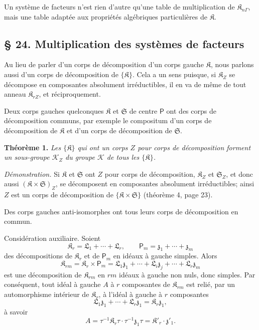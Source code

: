 Un système de facteurs n'est rien d'autre qu'une table de multiplication de \(\mathfrak K_{n\Gamma}\), mais une table adaptée aux propriétés algébriques particulières de \(\mathfrak K\).

\subsection*{\S{} 24. Multiplication des systèmes de facteurs}\label{fr-r823-multiplication-systemes-facteurs}

Au lieu de parler d'un corps de décomposition d'un corps gauche \(\mathfrak K\), nous parlons aussi d'un corps de décomposition de \(\{\mathfrak K\}\). Cela a un sens puisque, si \(\mathfrak K_Z\) se décompose en composantes absolument irréductibles, il en va de même de tout anneau \(\mathfrak K_{rZ}\), et réciproquement.

Deux corps gauches quelconques \(\mathfrak K\) et \(\mathfrak S\) de centre \(\mathsf P\) ont des corps de décomposition communs, par exemple le compositum d'un corps de décomposition de \(\mathfrak K\) et d'un corps de décomposition de \(\mathfrak S\).

\textbf{Théorème 1.} \emph{Les \(\{\mathfrak K\}\) qui ont un corps \(Z\) pour corps de décomposition forment un sous-groupe \(\mathscr K_Z\) du groupe \(\mathscr K\) de tous les \(\{\mathfrak K\}\).}

\emph{Démonstration.} Si \(\mathfrak K\) et \(\mathfrak S\) ont \(Z\) pour corps de décomposition, \(\mathfrak K_Z\) et \(\mathfrak S_Z\), et donc aussi \((\mathfrak K\times\mathfrak S)_Z\), se décomposent en composantes absolument irréductibles; ainsi \(Z\) est un corps de décomposition de \(\{\mathfrak K\times\mathfrak S\}\) (théorème 4, page 23).

Des corps gauches anti-isomorphes ont tous leurs corps de décomposition en commun.

Considération auxiliaire. Soient
\[
\mathfrak K_r=\mathfrak L_1+\cdots+\mathfrak L_r,\qquad
\mathsf P_m=\mathfrak z_1+\cdots+\mathfrak z_m
\]
des décompositions de \(\mathfrak K_r\) et de \(\mathsf P_m\) en idéaux à gauche simples. Alors
\[
\mathfrak K_{rm}=\mathfrak K_r\times\mathsf P_m
=\mathfrak L_1\mathfrak z_1+\cdots+\mathfrak L_i\mathfrak z_j+\cdots+\mathfrak L_r\mathfrak z_m
\]
est une décomposition de \(\mathfrak K_{rm}\) en \(rm\) idéaux à gauche non nuls, donc simples. Par conséquent, tout idéal à gauche \(A\) à \(r\) composantes de \(\mathfrak K_{rm}\) est relié, par un automorphisme intérieur de \(\mathfrak K_r\), à l'idéal à gauche à \(r\) composantes
\[
\mathfrak L_1\mathfrak z_1+\cdots+\mathfrak L_r\mathfrak z_1=\mathfrak K_r\mathfrak z_1,
\]
à savoir
\[
A=\tau^{-1}\mathfrak K_r\tau\cdot\tau^{-1}\mathfrak z_1\tau
=\mathfrak K'_r\cdot\mathfrak z'_1.
\]

